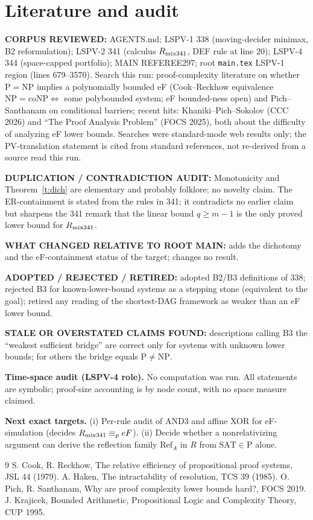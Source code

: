 \documentclass[11pt]{article}
\begin{document}
\section{Literature and audit}
\textbf{CORPUS REVIEWED:} AGENTS.md; LSPV-1 338 (moving-decider minimax, B2 reformulation); LSPV-2 341 (calculus $R_{\rm mix341}$, DEF rule at line 20); LSPV-4 344 (space-capped portfolio); MAIN REFEREE297; root \texttt{main.tex} LSPV-1 region (lines 679--3570). Search this run: proof-complexity literature on whether $\mathrm P=\mathrm{NP}$ implies a polynomially bounded eF (Cook--Reckhow equivalence $\mathrm{NP}=\mathrm{coNP}\iff$ some polybounded system; eF bounded-ness open) and Pich--Santhanam on conditional barriers; recent hits: Khaniki--Pich--Sokolov (CCC 2026) and ``The Proof Analysis Problem'' (FOCS 2025), both about the difficulty of analyzing eF lower bounds. Searches were standard-mode web results only; the PV-translation statement is cited from standard references, not re-derived from a source read this run.

\textbf{DUPLICATION / CONTRADICTION AUDIT:} Monotonicity and Theorem~\ref{t:dich} are elementary and probably folklore; no novelty claim. The ER-containment is stated from the rules in 341; it contradicts no earlier claim but sharpens the 341 remark that the linear bound $q\ge m-1$ is the only proved lower bound for $R_{\rm mix341}$.

\textbf{WHAT CHANGED RELATIVE TO ROOT MAIN:} adds the dichotomy and the eF-containment status of the target; changes no result.

\textbf{ADOPTED / REJECTED / RETIRED:} adopted B2/B3 definitions of 338; rejected B3 for known-lower-bound systems as a stepping stone (equivalent to the goal); retired any reading of the shortest-DAG framework as weaker than an eF lower bound.

\textbf{STALE OR OVERSTATED CLAIMS FOUND:} descriptions calling B3 the ``weakest sufficient bridge'' are correct only for systems with unknown lower bounds; for others the bridge equals $\mathrm P\ne\mathrm{NP}$.

\textbf{Time-space audit (LSPV-4 role).} No computation was run. All statements are symbolic; proof-size accounting is by node count, with no space measure claimed.

\textbf{Next exact targets.} (i) Per-rule audit of AND3 and affine XOR for eF-simulation (decides $R_{\rm mix341}\equiv_p eF$). (ii) Decide whether a nonrelativizing argument can derive the reflection family $\mathrm{Ref}_A$ in $R$ from $\mathrm{SAT}\in\mathrm P$ alone.

\begin{thebibliography}{9}
 S. Cook, R. Reckhow, The relative efficiency of propositional proof systems, JSL 44 (1979).
 A. Haken, The intractability of resolution, TCS 39 (1985).
 O. Pich, R. Santhanam, Why are proof complexity lower bounds hard?, FOCS 2019.
 J. Krajicek, Bounded Arithmetic, Propositional Logic and Complexity Theory, CUP 1995.
\end{thebibliography}
\end{document}
